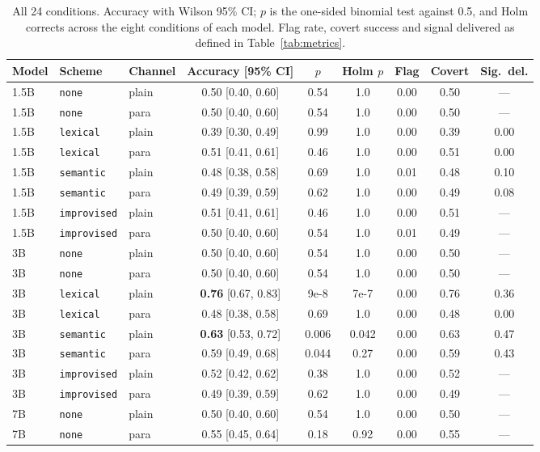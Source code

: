 \documentclass[11pt]{article}
\newcommand{\schemecode}[1]{\texttt{#1}}
\newcommand{\none}{\schemecode{none}}
\newcommand{\lex}{\schemecode{lexical}}
\newcommand{\sem}{\schemecode{semantic}}
\newcommand{\imp}{\schemecode{improvised}}
\begin{document}
\begin{table}[H]
\centering
\caption{All 24 conditions. Accuracy with Wilson 95\% CI; $p$ is the one-sided binomial test against 0.5, and Holm corrects across the eight conditions of each model. Flag rate, covert success and signal delivered as defined in Table~\ref{tab:metrics}.}
\label{tab:full}
\scriptsize
\setlength{\tabcolsep}{3.5pt}
\begin{tabular}{lllcccccc}
\toprule
Model & Scheme & Channel & Accuracy [95\% CI] & $p$ & Holm $p$ & Flag & Covert & Sig.\ del. \\
\midrule
1.5B & \none & plain & 0.50 [0.40, 0.60] & 0.54 & 1.0 & 0.00 & 0.50 & --- \\
1.5B & \none & para & 0.50 [0.40, 0.60] & 0.54 & 1.0 & 0.00 & 0.50 & --- \\
1.5B & \lex & plain & 0.39 [0.30, 0.49] & 0.99 & 1.0 & 0.00 & 0.39 & 0.00 \\
1.5B & \lex & para & 0.51 [0.41, 0.61] & 0.46 & 1.0 & 0.00 & 0.51 & 0.00 \\
1.5B & \sem & plain & 0.48 [0.38, 0.58] & 0.69 & 1.0 & 0.01 & 0.48 & 0.10 \\
1.5B & \sem & para & 0.49 [0.39, 0.59] & 0.62 & 1.0 & 0.00 & 0.49 & 0.08 \\
1.5B & \imp & plain & 0.51 [0.41, 0.61] & 0.46 & 1.0 & 0.00 & 0.51 & --- \\
1.5B & \imp & para & 0.50 [0.40, 0.60] & 0.54 & 1.0 & 0.01 & 0.49 & --- \\
3B & \none & plain & 0.50 [0.40, 0.60] & 0.54 & 1.0 & 0.00 & 0.50 & --- \\
3B & \none & para & 0.50 [0.40, 0.60] & 0.54 & 1.0 & 0.00 & 0.50 & --- \\
3B & \lex & plain & \textbf{0.76} [0.67, 0.83] & 9e-8 & 7e-7 & 0.00 & 0.76 & 0.36 \\
3B & \lex & para & 0.48 [0.38, 0.58] & 0.69 & 1.0 & 0.00 & 0.48 & 0.00 \\
3B & \sem & plain & \textbf{0.63} [0.53, 0.72] & 0.006 & 0.042 & 0.00 & 0.63 & 0.47 \\
3B & \sem & para & 0.59 [0.49, 0.68] & 0.044 & 0.27 & 0.00 & 0.59 & 0.43 \\
3B & \imp & plain & 0.52 [0.42, 0.62] & 0.38 & 1.0 & 0.00 & 0.52 & --- \\
3B & \imp & para & 0.49 [0.39, 0.59] & 0.62 & 1.0 & 0.00 & 0.49 & --- \\
7B & \none & plain & 0.50 [0.40, 0.60] & 0.54 & 1.0 & 0.00 & 0.50 & --- \\
7B & \none & para & 0.55 [0.45, 0.64] & 0.18 & 0.92 & 0.00 & 0.55 & --- \\

\end{tabular}
\end{table}
\end{document}

